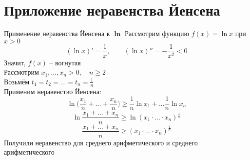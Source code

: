 \section{Приложение неравенства Йенсена}

\begin{undefthm}{Применение неравенства Йенсена к $\bm\ln$}
    Рассмотрим функцию $ f(x) = \ln x$ при $x > 0$
    $$ (\ln x)' = \frac1x, \qquad (\ln x)'' = -\frac1{x^2} < 0 $$
    Значит, $f (x)$ -- вогнутая \\
    Рассмотрим $x_1, ..., x_n > 0, \quad n \ge 2 $ \\
    Возьмём $t_1 = t_2 = ... = t_n = \frac1n $ \\
    Применим неравенство Йенсена:
    $$ \ln \bigg( \frac{x_1}n + ... + \frac{x_n}n \bigg) \ge \frac1n \ln x_1 + ... \frac1n \ln x_n $$
    $$ \ln \frac{x_1 + ... + x_n}n \ge \ln (x_1 \cdot ... \cdot x_n)^{\frac1n} $$
    $$ \frac{x_1 + ... + x_n}n \ge (x_1 \cdot ... \cdot x_n)^{\frac1n} $$
    Получили неравенство для среднего арифметического и среднего арифметического
\end{undefthm}

